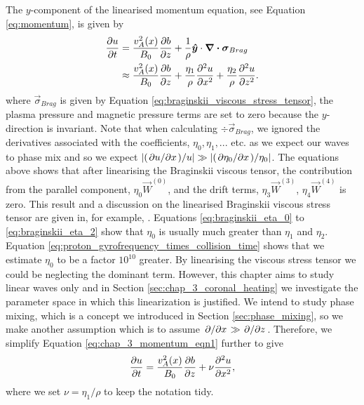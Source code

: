 The $y$-component of the linearised momentum equation, see Equation \eqref{eq:momentum}, is given by
\begin{equation}
    \label{eq:chap_3_momentum_eqn1}
    \begin{aligned}
    \pdv{u}{t} &= \frac{v_A^2(x)}{B_0}\pdv{b}{z} + \frac{1}{\rho}\boldsymbol{\hat{y}}\cdot\div{\boldsymbol{\sigma}_{Brag}} \\
    &\approx\frac{v_A^2(x)}{B_0}\pdv{b}{z} +\frac{\eta_1}{\rho} \pdv[2]{u}{x} + \frac{\eta_2}{\rho} \pdv[2]{u}{z}.
    \end{aligned}
\end{equation}
where $\vec{\sigma}_{Brag}$ is given by Equation \eqref{eq:braginskii_viscous_stress_tensor}, the plasma pressure and magnetic pressure terms are set to zero because the $y$-direction is invariant. Note that when calculating $\div\vec{\sigma}_{Brag}$, we ignored the derivatives associated with the coefficients, $\eta_0,\eta_1, ...$ etc. as we expect our waves to phase mix and so we expect $\abs{(\pdv*{u}{x})/u}\gg\abs{(\pdv*{\eta_0}{x})/\eta_0}$. The equations above shows that after linearising the Braginskii viscous tensor, the contribution from the parallel component, $\eta_0\vec{W}^{(0)}$, and the drift terms, $\eta_3\vec{W}^{(3)}$, $\eta_4\vec{W}^{(4)}$ is zero. This result and a discussion on the linearised Braginskii viscous stress tensor are given in, for example, \citet{Ruderman2000,Mocanu2008}. Equations \eqref{eq:braginskii_eta_0} to \eqref{eq:braginskii_eta_2} show that $\eta_0$ is usually much greater than $\eta_1$ and $\eta_2$. Equation \eqref{eq:proton_gyrofrequency_times_collision_time} shows that we estimate $\eta_0$ to be a factor $10^{10}$ greater. By linearising the viscous stress tensor we could be neglecting the dominant term. However, this chapter aims to study linear waves only and in Section \ref{sec:chap_3_coronal_heating} we investigate the parameter space in which this linearization is justified. We intend to study phase mixing, which is a concept we introduced in Section \ref{sec:phase_mixing}, so we make another assumption which is to assume $\pdv*{}{x}\gg\pdv*{}{z}$. Therefore, we simplify Equation \eqref{eq:chap_3_momentum_eqn1} further to give
\begin{equation}
    \label{eq:chap_3_momentum_eqn2}
    \pdv{u}{t}=\frac{v_A^2(x)}{B_0}\pdv{b}{z} +\nu\pdv[2]{u}{x},
\end{equation}
where we set $\nu = \eta_1/\rho$ to keep the notation tidy.

